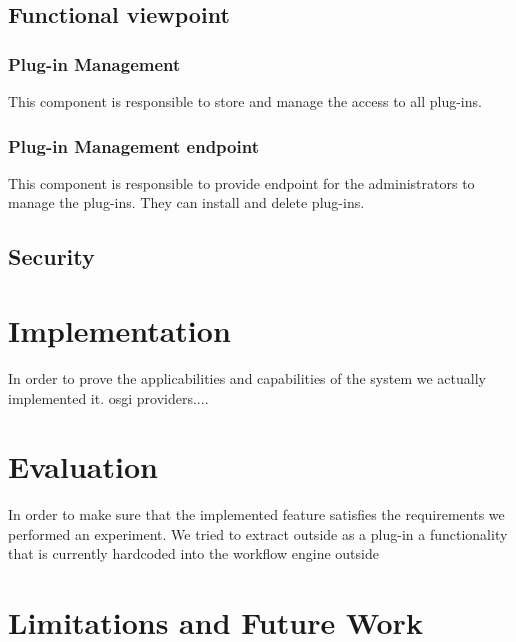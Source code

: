 \subsection{Functional viewpoint}

\subsubsection{Plug-in Management}

This component is responsible to store and manage the access to all plug-ins.

\subsubsection{Plug-in Management endpoint}

This component is responsible to provide endpoint for the administrators to manage the plug-ins. They can install and delete plug-ins.

\subsection{Security}

\section{Implementation}

In order to prove the applicabilities and capabilities of the system we actually implemented it.
osgi providers....

\section{Evaluation}

In order to make sure that the implemented feature satisfies the requirements we performed an experiment. We tried to extract outside as a plug-in a functionality that is currently hardcoded into the workflow engine outside

\section{Limitations and Future Work}


